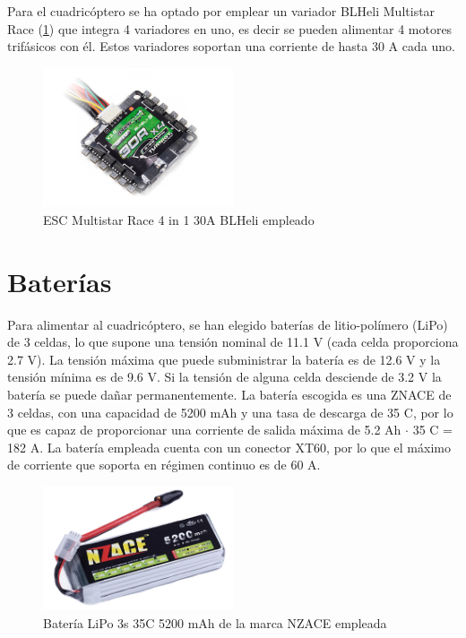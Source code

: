 Para el cuadricóptero se ha optado por emplear un variador BLHeli Multistar Race (\cref{hardware:esc}) que integra 4 variadores en uno, es decir se pueden alimentar 4 motores trifásicos con él. Estos variadores soportan una corriente de hasta 30 A cada uno.

\begin{figure}[htb!]
	\centering
	\includegraphics[width=0.5\textwidth]{hardware/esc.jpg}
	\caption{ESC Multistar Race 4 in 1 30A BLHeli empleado}
	\label{hardware:esc}
\end{figure}

\section{Baterías}
Para alimentar al cuadricóptero, se han elegido baterías de litio-polímero (LiPo) de 3 celdas, lo que supone una tensión nominal de 11.1 V (cada celda proporciona 2.7 V). La tensión máxima que puede subministrar la batería es de 12.6 V y la tensión mínima es de 9.6 V. Si la tensión de alguna celda desciende de 3.2 V la batería se puede dañar permanentemente. La batería escogida es una ZNACE de 3 celdas, con una capacidad de 5200 mAh y una tasa de descarga de 35 C, por lo que es capaz de proporcionar una corriente de salida máxima de 5.2 Ah $\cdot$ 35 C = 182 A. La batería empleada cuenta con un conector XT60, por lo que el máximo de corriente que soporta en régimen continuo es de 60 A.

\begin{figure}[htb!]
		\centering
		\includegraphics[width=0.5\textwidth]{hardware/bateriaNZACE}
		\caption{Batería LiPo 3s 35C 5200 mAh de la marca NZACE empleada  }
		\label{hardware:Lipo}

\end{figure}


